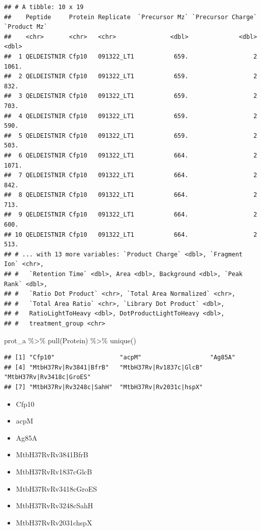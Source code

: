 \documentclass[
]{book}
\newenvironment{Shaded}{\begin{snugshade}}{\end{snugshade}}
\newcommand{\FunctionTok}[1]{\textcolor[rgb]{0.00,0.00,0.00}{#1}}
\newcommand{\NormalTok}[1]{#1}
\newcommand{\SpecialCharTok}[1]{\textcolor[rgb]{0.00,0.00,0.00}{#1}}
\providecommand{\tightlist}{%
  \setlength{\itemsep}{0pt}\setlength{\parskip}{0pt}}
\begin{document}
\begin{verbatim}
## # A tibble: 10 x 19
##    Peptide     Protein Replicate  `Precursor Mz` `Precursor Charge` `Product Mz`
##    <chr>       <chr>   <chr>               <dbl>              <dbl>        <dbl>
##  1 QELDEISTNIR Cfp10   091322_LT1           659.                  2        1061.
##  2 QELDEISTNIR Cfp10   091322_LT1           659.                  2         832.
##  3 QELDEISTNIR Cfp10   091322_LT1           659.                  2         703.
##  4 QELDEISTNIR Cfp10   091322_LT1           659.                  2         590.
##  5 QELDEISTNIR Cfp10   091322_LT1           659.                  2         503.
##  6 QELDEISTNIR Cfp10   091322_LT1           664.                  2        1071.
##  7 QELDEISTNIR Cfp10   091322_LT1           664.                  2         842.
##  8 QELDEISTNIR Cfp10   091322_LT1           664.                  2         713.
##  9 QELDEISTNIR Cfp10   091322_LT1           664.                  2         600.
## 10 QELDEISTNIR Cfp10   091322_LT1           664.                  2         513.
## # ... with 13 more variables: `Product Charge` <dbl>, `Fragment Ion` <chr>,
## #   `Retention Time` <dbl>, Area <dbl>, Background <dbl>, `Peak Rank` <dbl>,
## #   `Ratio Dot Product` <chr>, `Total Area Normalized` <chr>,
## #   `Total Area Ratio` <chr>, `Library Dot Product` <dbl>,
## #   RatioLightToHeavy <dbl>, DotProductLightToHeavy <dbl>,
## #   treatment_group <chr>
\end{verbatim}

\begin{Shaded}
\begin{Highlighting}[]
\NormalTok{prot\_a }\SpecialCharTok{\%\textgreater{}\%} 
  \FunctionTok{pull}\NormalTok{(Protein) }\SpecialCharTok{\%\textgreater{}\%} 
  \FunctionTok{unique}\NormalTok{()}
\end{Highlighting}
\end{Shaded}

\begin{verbatim}
## [1] "Cfp10"                  "acpM"                   "Ag85A"                 
## [4] "MtbH37Rv|Rv3841|BfrB"   "MtbH37Rv|Rv1837c|GlcB"  "MtbH37Rv|Rv3418c|GroES"
## [7] "MtbH37Rv|Rv3248c|SahH"  "MtbH37Rv|Rv2031c|hspX"
\end{verbatim}

\begin{itemize}
\tightlist
\item
  Cfp10
\item
  acpM
\item
  Ag85A
\item
  MtbH37Rv\textbar Rv3841\textbar BfrB
\item
  MtbH37Rv\textbar Rv1837c\textbar GlcB
\item
  MtbH37Rv\textbar Rv3418c\textbar GroES
\item
  MtbH37Rv\textbar Rv3248c\textbar SahH
\item
  MtbH37Rv\textbar Rv2031c\textbar hspX
\end{itemize}

  
\end{document}
